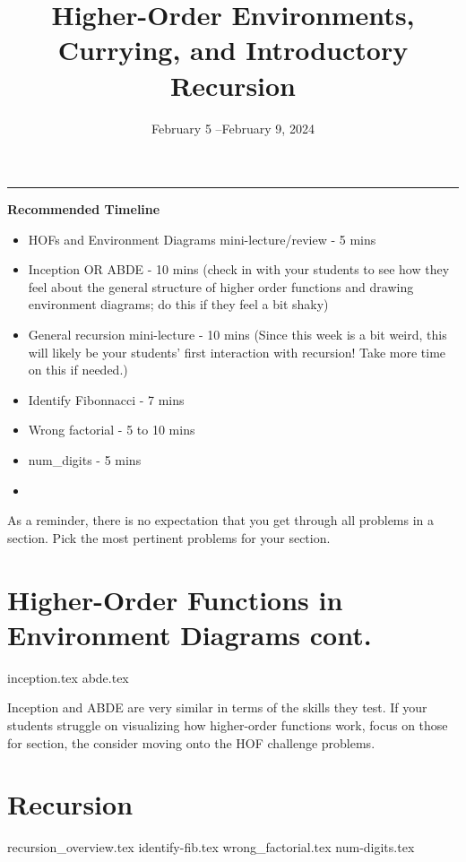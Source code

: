 \documentclass{exam}
\title{Higher-Order Environments, Currying, and Introductory Recursion}
\date{February 5 --February 9, 2024}
\begin{document}
\maketitle
\rule{\textwidth}{0.15em}
\fontsize{12}{15}\selectfont

\begin{meta}
\textbf{Recommended Timeline}
\begin{itemize}
    \item HOFs and Environment Diagrams mini-lecture/review - 5 mins
    \item Inception OR ABDE - 10 mins (check in with your students to see how they feel about the general structure of higher order functions and drawing environment diagrams; do this if they feel a bit shaky)
    \item General recursion mini-lecture - 10 mins (Since this week is a bit weird, this will likely be your students' first interaction with recursion! Take more time on this if needed.)
    \item Identify Fibonnacci - 7 mins
    \item Wrong factorial - 5 to 10 mins
    \item num\_digits - 5 mins
    \item
\end{itemize}
As a reminder, there is no expectation that you get through all problems in a section. Pick the most pertinent problems for your section. 
\end{meta}

\begin{questions}
    \section{Higher-Order Functions in Environment Diagrams cont.}
    {inception.tex}
    {abde.tex}
    \begin{questionmeta}
        Inception and ABDE are very similar in terms of the skills they test. If your students struggle on visualizing how higher-order functions work, focus on those for section, the consider moving onto the HOF challenge problems.
    \end{questionmeta}

    \section{Recursion}
    {recursion_overview.tex}
    {identify-fib.tex}
    {wrong_factorial.tex}
    {num-digits.tex}
\end{questions}
\end{document}
